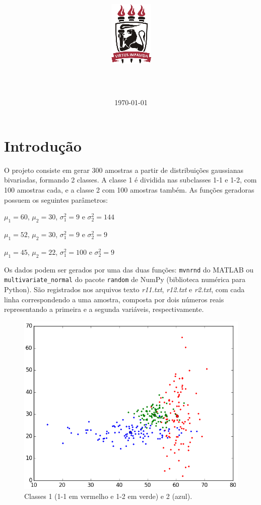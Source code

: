\documentclass[12pt,twoside]{report}
\title{
    {\includegraphics{ufpelogo.png}}
    \\
    {\large \universityname}
    \\
    {\large \centername}
    \vfill
    \textbf{\papertitle}
    \vfill
}
\author{\authorname}
\date{\normalsize\vfill \today}
\newcommand{\captiontext}[1]{\small{#1}}
\newcommand{\code}[1]{\texttt{#1}}
\begin{document}
\maketitle

\chapter*{Introdução}

O projeto consiste em gerar 300 amostras a partir de distribuições gaussianas
bivariadas, formando 2 classes. A classe 1 é dividida nas subclasses 1-1 e 1-2,
com 100 amostras cada, e a classe 2 com 100 amostras também. As funções geradoras
possuem os seguintes parâmetros:

\begin{description}\itemsep0pt
    \item[1-1:] $\mu_1 = 60$, $\mu_2 = 30$, $\sigma_1^2 = 9$ e $\sigma_2^2 = 144$
    \item[1-2:] $\mu_1 = 52$, $\mu_2 = 30$, $\sigma_1^2 = 9$ e $\sigma_2^2 = 9$
    \item[2:] $\mu_1 = 45$, $\mu_2 = 22$, $\sigma_1^2 = 100$ e $\sigma_2^2 = 9$
\end{description}

Os dados podem ser gerados por uma das duas funções: \code{mvnrnd} do MATLAB ou
\code{multivariate\_normal} do pacote \code{random} de NumPy (biblioteca numérica
para Python). São registrados nos arquivos texto \emph{r11.txt}, \emph{r12.txt} e
\emph{r2.txt}, com cada linha correspondendo a uma amostra, composta por dois números
reais representando a primeira e a segunda variáveis, respectivamente.

\begin{figure}[H]
    \centering
    \includegraphics[scale=0.5]{original_data}
    \caption{\captiontext{Classes 1 (1-1 em vermelho e 1-2 em verde) e 2 (azul).}}
    \label{fig:original_data}
\end{figure}
\end{document}
